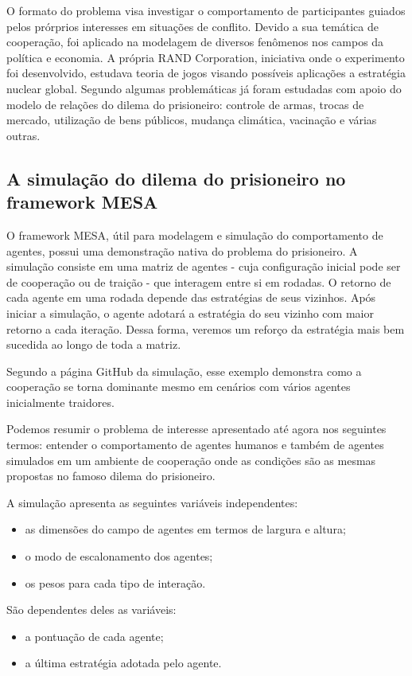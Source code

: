O formato do problema visa investigar o comportamento de participantes guiados pelos prórprios interesses em situações de conflito. Devido a sua temática de cooperação, foi aplicado na modelagem de diversos fenômenos nos campos da política e economia. A própria RAND Corporation, iniciativa onde o experimento foi desenvolvido, estudava teoria de jogos visando possíveis aplicações a estratégia nuclear global. Segundo \cite{amadae_prisoners_2016} algumas problemáticas já foram estudadas com apoio do modelo de relações do dilema do prisioneiro: controle de armas, trocas de mercado, utilização de bens públicos, mudança climática, vacinação e várias outras.

\subsection{A simulação do dilema do prisioneiro no framework MESA}
\label{MASSA@joaoadm94:simulacao}
O framework MESA, útil para modelagem e simulação do comportamento de agentes, possui uma demonstração nativa do problema do prisioneiro. A simulação consiste em uma matriz de agentes - cuja configuração inicial pode ser de cooperação ou de traição - que interagem entre si em rodadas. O retorno de cada agente em uma rodada depende das estratégias de seus vizinhos. Após iniciar a simulação, o agente adotará a estratégia do seu vizinho com maior retorno a cada iteração. Dessa forma, veremos um reforço da estratégia mais bem sucedida ao longo de toda a matriz.

Segundo a página GitHub da simulação, esse exemplo demonstra como a cooperação se torna dominante mesmo em cenários com vários agentes inicialmente traidores.

Podemos resumir o problema de interesse apresentado até agora nos seguintes termos: entender o comportamento de agentes humanos e também de agentes simulados em um ambiente de cooperação onde as condições são as mesmas propostas no famoso dilema do prisioneiro.

A simulação apresenta as seguintes variáveis independentes: 
\begin{itemize}
    \item as dimensões do campo de agentes em termos de largura e altura;
    \item o modo de escalonamento dos agentes;
    \item os pesos para cada tipo de interação.
\end{itemize}

São dependentes deles as variáveis:
\begin{itemize}
    \item a pontuação de cada agente;
    \item a última estratégia adotada pelo agente.
\end{itemize}

